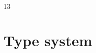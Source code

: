 \documentclass[a4paper,11pt]{article}
\theoremstyle{definition}
\begin{document}


13%


\clearpage


\section{Type system}




% 



\end{document}
